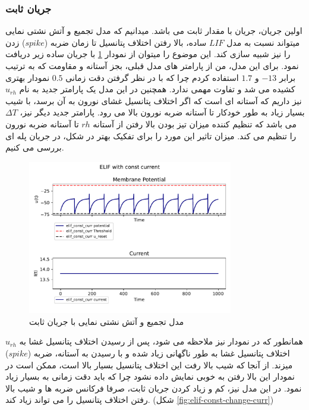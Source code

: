 \documentclass{article}
\begin{document}
            \subsubsection{جریان ثابت}
                اولین جریان، جریان با مقدار ثابت می باشد. میدانیم که مدل تجمیع و آتش نشتی نمایی میتواند نسبت به مدل 
                $LIF$ 
                ساده، بالا رفتن اختلاف پتانسیل تا زمان ضربه
                ($spike$) 
                زدن را نیز شبیه سازی کند. این موضوع را میتوان از نمودار
                \ref{fig:elif-const-curr}
                با جریان ساده زیر دریافت نمود.
                برای این مدل، من از پارامتر های مدل قبلی، بجز آستانه و مقاومت که به ترتیب برابر 
                $-13$ و
                $1.7$
                استفاده کردم چرا که با در نظر گرفتن دقت زمانی 
                $0.5$
                نمودار بهتری کشیده می شد و تفاوت مهمی ندارد. همچنین در این مدل یک پارامتر جدید به نام
                $u_{rh}$ 
                نیز داریم که آستانه ای است که اگر اختلاف پتانسیل غشای نورون به آن برسد، با شیب بسیار زیاد به طور خودکار تا آستانه ضربه نورون بالا می رود. پارامتر جدید دیگر نیز، 
                $\Delta T$ می باشد که تنظیم کننده میزان تیز بودن بالا رفتن از آستانه 
                $rh$ 
                تا آستانه ضربه نورون را تنظیم می کند. میزان تاثیر این مورد را برای تفکیک بهتر در شکل، در جریان پله ای بررسی می کنیم.
                \begin{figure}[H]
                    \centering
                    \includegraphics[width=0.8\textwidth]{plots/ELIF with const current.pdf} 
                    \caption{مدل تجمیع و آتش نشتی نمایی با جریان ثابت}
                    \label{fig:elif-const-curr}
                \end{figure}
                همانطور که در نمودار نیز ملاحظه می شود، پس از رسیدن اختلاف پتانسیل غشا به 
                $u_{rh}$ 
                اختلاف پتانسیل غشا به طور ناگهانی زیاد شده و با رسیدن به آستانه، ضربه
                ($spike$) 
                میزند. از آنجا که شیب بالا رفت این اختلاف پتانسیل بسیار بالا است، ممکن است در نمودار این بالا رفتن به خوبی نمایش داده نشود چرا که باید دقت زمانی به بسیار زیاد نمود. در این مدل نیز، کم و زیاد کردن جریان ثابت، صرفا فرکانس ضربه ها و شیب بالا رفتن اختلاف پتانسیل را می تواند زیاد کند. 
                (شکل \ref{fig:elif-const-change-curr})
\end{document}
